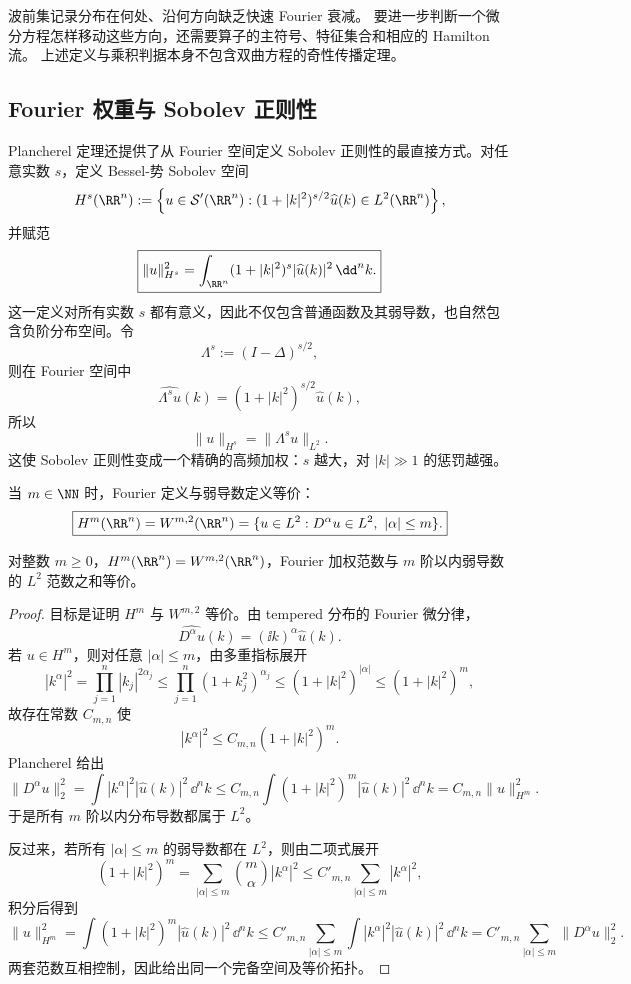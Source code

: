 \begin{note}[波前集与奇性传播的区别]
波前集记录分布在何处、沿何方向缺乏快速 Fourier 衰减。
要进一步判断一个微分方程怎样移动这些方向，还需要算子的主符号、特征集合和相应的 Hamilton 流。
上述定义与乘积判据本身不包含双曲方程的奇性传播定理。
\end{note}

\subsection{Fourier 权重与 Sobolev 正则性}
Plancherel 定理还提供了从 Fourier 空间定义 Sobolev 正则性的最直接方式。对任意实数 $s$，定义 Bessel-势 Sobolev 空间
\begin{equation*}H^s(\RR^n)
:=\left\{u\in\mathcal S'(\RR^n):
(1+|k|^2)^{s/2}\widehat u(k)\in L^2(\RR^n)\right\},\end{equation*}
并赋范
\begin{equation*}\boxed{
\|u\|_{H^s}^2
=\int_{\RR^n}(1+|k|^2)^s|\widehat u(k)|^2\,\dd^n k.
}\end{equation*}
这一定义对所有实数 $s$ 都有意义，因此不仅包含普通函数及其弱导数，也自然包含负阶分布空间。令
\[
\Lambda^s:=(I-\Delta)^{s/2},
\]
则在 Fourier 空间中
\[
\widehat{\Lambda^su}(k)
=(1+|k|^2)^{s/2}\widehat u(k),
\]
所以
\[
\|u\|_{H^s}=\|\Lambda^su\|_{L^2}.
\]
这使 Sobolev 正则性变成一个精确的高频加权：$s$ 越大，对 $|k|\gg1$ 的惩罚越强。

当 $m\in\NN$ 时，Fourier 定义与弱导数定义等价：
\begin{equation*}\boxed{
H^m(\RR^n)
=W^{m,2}(\RR^n)
=\{u\in L^2:D^\alpha u\in L^2,\ |\alpha|\le m\}.
}\end{equation*}

\begin{theorem}
对整数 $m\ge0$，$H^m(\RR^n)=W^{m,2}(\RR^n)$，Fourier 加权范数与 $m$ 阶以内弱导数的 $L^2$ 范数之和等价。
\end{theorem}
\begin{proof}
目标是证明 $H^m$ 与 $W^{m,2}$ 等价。由 tempered 分布的 Fourier 微分律，
\[
\widehat{D^\alpha u}(k)
=(\ii k)^\alpha\widehat u(k).
\]
若 $u\in H^m$，则对任意 $|\alpha|\le m$，由多重指标展开
\[
|k^\alpha|^2
=\prod_{j=1}^n|k_j|^{2\alpha_j}
\le\prod_{j=1}^n(1+k_j^2)^{\alpha_j}
\le(1+|k|^2)^{|\alpha|}
\le(1+|k|^2)^m,
\]
故存在常数 $C_{m,n}$ 使
\[
|k^\alpha|^2
\le C_{m,n}(1+|k|^2)^m.
\]
Plancherel 给出
\[
\|D^\alpha u\|_2^2
=\int|k^\alpha|^2|\widehat u(k)|^2\,\dd^n k
\le C_{m,n}\int(1+|k|^2)^m|\widehat u(k)|^2\,\dd^n k
=C_{m,n}\|u\|_{H^m}^2.
\]
于是所有 $m$ 阶以内分布导数都属于 $L^2$。

反过来，若所有 $|\alpha|\le m$ 的弱导数都在 $L^2$，则由二项式展开
\[
(1+|k|^2)^m
=\sum_{|\alpha|\le m}\binom{m}{\alpha}|k^\alpha|^2
\le C'_{m,n}\sum_{|\alpha|\le m}|k^\alpha|^2,
\]
积分后得到
\[
\|u\|_{H^m}^2
=\int(1+|k|^2)^m|\widehat u(k)|^2\,\dd^n k
\le C'_{m,n}\sum_{|\alpha|\le m}\int|k^\alpha|^2|\widehat u(k)|^2\,\dd^n k
=C'_{m,n}\sum_{|\alpha|\le m}\|D^\alpha u\|_2^2.
\]
两套范数互相控制，因此给出同一个完备空间及等价拓扑。
\end{proof}

